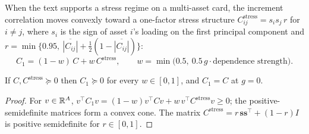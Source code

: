 When the text supports a stress regime on a multi-asset card, the increment correlation moves convexly toward a one-factor stress structure
$C^{\text{stress}}_{ij}=s_is_j\,r$ for $i\ne j$, where $s_i$ is the sign of asset $i$'s loading on the first principal component and
$r=\min\{0.95,\ \overline{|C_{ij}|}+\tfrac12(1-\overline{|C_{ij}|})\}$:
\begin{equation}
  C_1 = (1-w)\,C + w\,C^{\text{stress}},\qquad w=\min\bigl(0.5,\ 0.5\,g\cdot\text{dependence strength}\bigr).
\end{equation}
\begin{proposition}\label{prop:psd}
If $C,C^{\text{stress}}\succeq0$ then $C_1\succeq0$ for every $w\in[0,1]$, and $C_1=C$ at $g=0$.
\end{proposition}
\begin{proof}
For $v\in\mathbb{R}^A$, $v^\top C_1v=(1-w)v^\top Cv+w\,v^\top C^{\text{stress}}v\ge0$; the positive-semidefinite matrices form a convex cone. The matrix
$C^{\text{stress}}=r\,\bm s\bm s^\top+(1-r)I$ is positive semidefinite for $r\in[0,1]$.
\end{proof}

